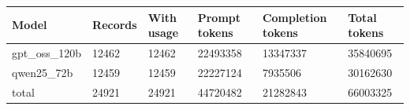 \begin{tabular}{llllll}
\hline
Model & Records & With usage & Prompt tokens & Completion tokens & Total tokens \\
\hline
gpt\_oss\_120b & 12462 & 12462 & 22493358 & 13347337 & 35840695 \\
qwen25\_72b & 12459 & 12459 & 22227124 & 7935506 & 30162630 \\
total & 24921 & 24921 & 44720482 & 21282843 & 66003325 \\
\hline
\end{tabular}
